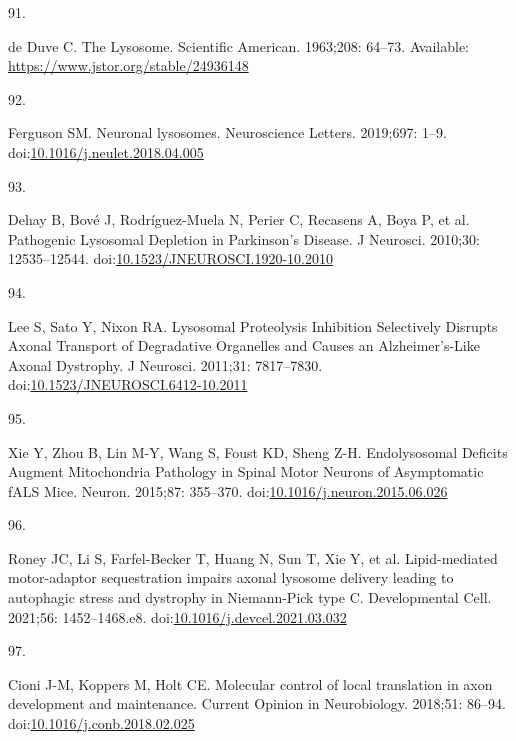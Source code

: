 \documentclass[
  12pt,
  a4paper,
]{book}
\newlength{\cslhangindent}
\newlength{\csllabelwidth}
\newenvironment{CSLReferences}[2] %
 {\begin{list}{}{%
  \setlength{\itemindent}{0pt}
  \setlength{\leftmargin}{0pt}
  \setlength{\parsep}{0pt}
  \ifodd #1
   \setlength{\leftmargin}{\cslhangindent}
   \setlength{\itemindent}{-1\cslhangindent}
  \fi
  \setlength{\itemsep}{#2\baselineskip}}}
 {\end{list}}
\newcommand{\CSLLeftMargin}[1]{\parbox[t]{\csllabelwidth}{\strut#1\strut}}
\newcommand{\CSLRightInline}[1]{\parbox[t]{\linewidth - \csllabelwidth}{\strut#1\strut}}
\begin{document}
\begin{CSLReferences}{0}{1}
\CSLLeftMargin{91. }%
\CSLRightInline{de Duve C. The {Lysosome}. Scientific American. 1963;208: 64--73. Available: \url{https://www.jstor.org/stable/24936148}}

\CSLLeftMargin{92. }%
\CSLRightInline{Ferguson SM. Neuronal lysosomes. Neuroscience Letters. 2019;697: 1--9. doi:\href{https://doi.org/10.1016/j.neulet.2018.04.005}{10.1016/j.neulet.2018.04.005}}

\CSLLeftMargin{93. }%
\CSLRightInline{Dehay B, Bové J, Rodríguez-Muela N, Perier C, Recasens A, Boya P, et al. Pathogenic {Lysosomal Depletion} in {Parkinson}'s {Disease}. J Neurosci. 2010;30: 12535--12544. doi:\href{https://doi.org/10.1523/JNEUROSCI.1920-10.2010}{10.1523/JNEUROSCI.1920-10.2010}}

\CSLLeftMargin{94. }%
\CSLRightInline{Lee S, Sato Y, Nixon RA. Lysosomal {Proteolysis Inhibition Selectively Disrupts Axonal Transport} of {Degradative Organelles} and {Causes} an {Alzheimer}'s-{Like Axonal Dystrophy}. J Neurosci. 2011;31: 7817--7830. doi:\href{https://doi.org/10.1523/JNEUROSCI.6412-10.2011}{10.1523/JNEUROSCI.6412-10.2011}}

\CSLLeftMargin{95. }%
\CSLRightInline{Xie Y, Zhou B, Lin M-Y, Wang S, Foust KD, Sheng Z-H. Endolysosomal {Deficits Augment Mitochondria Pathology} in {Spinal Motor Neurons} of {Asymptomatic fALS Mice}. Neuron. 2015;87: 355--370. doi:\href{https://doi.org/10.1016/j.neuron.2015.06.026}{10.1016/j.neuron.2015.06.026}}

\CSLLeftMargin{96. }%
\CSLRightInline{Roney JC, Li S, Farfel-Becker T, Huang N, Sun T, Xie Y, et al. Lipid-mediated motor-adaptor sequestration impairs axonal lysosome delivery leading to autophagic stress and dystrophy in {Niemann-Pick} type {C}. Developmental Cell. 2021;56: 1452--1468.e8. doi:\href{https://doi.org/10.1016/j.devcel.2021.03.032}{10.1016/j.devcel.2021.03.032}}

\CSLLeftMargin{97. }%
\CSLRightInline{Cioni J-M, Koppers M, Holt CE. Molecular control of local translation in axon development and maintenance. Current Opinion in Neurobiology. 2018;51: 86--94. doi:\href{https://doi.org/10.1016/j.conb.2018.02.025}{10.1016/j.conb.2018.02.025}}


\end{CSLReferences}
\end{document}
